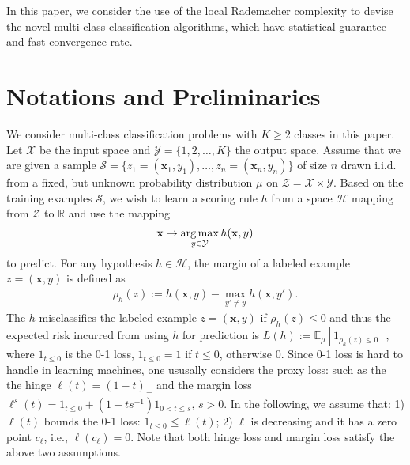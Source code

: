\documentclass{article}
\newcommand{\argmax}{\operatornamewithlimits{arg\,max}}
\newtheorem{definition}{Definition}
\begin{document}
In this paper, we consider the use of  the local Rademacher complexity to devise the novel  multi-class classification
algorithms, which have statistical guarantee and fast convergence rate.

\section{Notations and Preliminaries}
We consider multi-class classification problems with $K\geq 2$ classes in this paper.
Let $\mathcal{X}$ be the input space and $\mathcal{Y}=\{1,2,\ldots,K\}$ the output space.
Assume that we are given a sample
$
  \mathcal{S}=\{z_1=(\mathbf  x_1,y_1),\ldots, z_n=(\mathbf  x_n,y_n)\}
$
of size $n$ drawn i.i.d. from a fixed,
but unknown probability distribution $\mu$ on $\mathcal{Z}=\mathcal{X}\times\mathcal{Y}$.
Based on the training examples $\mathcal{S}$,
we wish to learn a scoring rule $h$ from a space $\mathcal{H}$ mapping from $\mathcal{Z}$ to $\mathbb{R}$
and use the mapping $$\mathbf x\rightarrow \argmax_{y\in\mathcal{Y}} h(\mathbf x,y)$$ to predict.
For any hypothesis $h\in\mathcal{H}$,
the margin of a labeled example $z=(\mathbf x,y)$ is defined as
\begin{align*}
  \rho_h(z):= h(\mathbf x,y)-\max_{y'\not =y} h(\mathbf x,y').
\end{align*}
The $h$ misclassifies the labeled example $z=(\mathbf x,y)$
if $\rho_h(z)\leq 0$ and thus the expected risk incurred
from using $h$ for prediction is
$
  L(h):=\mathbb{E}_\mu[1_{\rho_h(z)\leq 0}],
$
where $1_{t\leq 0}$ is the 0-1 loss,
$1_{t\leq 0}=1$ if $t\leq 0$, otherwise 0.
Since 0-1 loss is hard to handle in learning machines,
one ususally considers the proxy loss:
such as the  the hinge $\ell(t)=(1-t)_+$ and the margin loss $\ell^s(t)=1_{t\leq 0}+(1-ts^{-1})1_{0<t\leq s}$, $s>0$.
In the following, we assume that: 1) $\ell(t)$ bounds the 0-1 loss: $1_{t\leq 0}\leq \ell(t)$; 2)
$\ell$ is decreasing and it has a zero point $c_\ell$, i.e., $\ell(c_\ell)=0$.
Note that both hinge loss and margin loss satisfy the above two assumptions.
\end{document}
